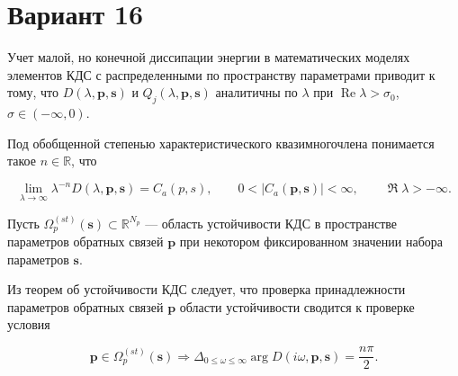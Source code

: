 \documentclass{article}
\begin{document}
	\section*{Вариант 16}
	
	Учет малой, но конечной диссипации энергии в математических моделях
	элементов КДС с распределенными по пространству параметрами приводит к тому,
	что $D(\lambda,\mathbf{p},\mathbf{s})$ и $Q_j(\lambda,\mathbf{p},\mathbf{s})$ аналитичны по $\lambda$ при
	$\operatorname{Re}\lambda > \sigma_0$, $\sigma \in (-\infty,0)$.
	
	Под обобщенной степенью характеристического квазимногочлена понимается такое
	$n \in \mathbb{R}$, что
	
	\begin{equation}
		\lim_{\lambda \to \infty}
		\lambda^{-n} D(\lambda,\mathbf{p},\mathbf{s})
		=
		C_a(p,s),
		\qquad
		0 < |C_a(\mathbf{p},\mathbf{s})| < \infty,
		\qquad
		\operatorname{\Re}\lambda > -\infty.
	\end{equation}
	
	Пусть $\Omega_p^{(st)}(\mathbf{s}) \subset \mathbb{R}^{N_p}$ ---
	область устойчивости КДС в пространстве параметров обратных связей $\mathbf{p}$
	при некотором фиксированном значении набора параметров $\mathbf{s}$.
	
	Из теорем об устойчивости КДС следует, что проверка принадлежности параметров
	обратных связей $\mathbf{p}$ области устойчивости сводится к проверке условия
	
	\begin{equation}
		\mathbf{p} \in \Omega_p^{(st)}(\mathbf{s})
		\Rightarrow
		\Delta_{0 \leq \omega \leq \infty}
		\arg D(i\omega,\mathbf{p},\mathbf{s})
		=
		\frac{n\pi}{2}.
	\end{equation}
	
\end{document}
